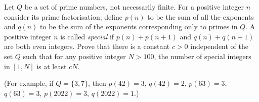 Let $Q$ be a set of prime numbers, not necessarily finite. For a positive integer $n$ consider its prime factorisation; define $p(n)$ to be the sum of all the exponents and $q(n)$ to be the sum of the exponents corresponding only to primes in $Q$. A positive integer $n$ is called \emph{special} if $p(n) + p(n + 1)$ and $q(n) + q(n+1)$ are both even integers. Prove that there is a constant $c > 0$ independent of the set $Q$ such that for any positive integer $N > 100$, the number of special integers in $[1, N]$ is at least $cN$.

(For example, if $Q = \{3, 7\}$, then $p(42) = 3$, $q(42) = 2$, $p(63) = 3$, $q(63) = 3$, $p(2022) = 3$, $q(2022) = 1$.)
